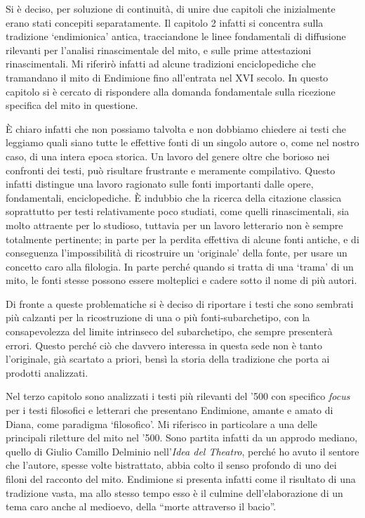 \documentclass[12pt,a4paper,openright, oneside]{book}
\begin{document}
Si è deciso, per soluzione di continuità, di unire due capitoli che inizialmente erano stati concepiti separatamente. Il capitolo 2 infatti si concentra sulla tradizione `endimionica' antica, tracciandone le linee fondamentali di diffusione rilevanti per l'analisi rinascimentale del mito, e sulle prime attestazioni rinascimentali. Mi riferirò infatti ad alcune tradizioni enciclopediche che tramandano il mito di Endimione fino all'entrata nel XVI secolo. In questo capitolo si è cercato di rispondere alla domanda fondamentale sulla ricezione specifica del mito in questione.

È chiaro infatti che non possiamo talvolta e non dobbiamo chiedere ai testi che leggiamo quali siano tutte le effettive fonti di un singolo autore o, come nel nostro caso, di una intera epoca storica. Un lavoro del genere oltre che borioso nei confronti dei testi, può risultare frustrante e meramente compilativo. Questo infatti distingue una lavoro ragionato sulle fonti importanti dalle opere, fondamentali, enciclopediche. È indubbio che la ricerca della citazione classica soprattutto per testi relativamente poco studiati, come quelli rinascimentali, sia molto attraente per lo studioso, tuttavia per un lavoro letterario non è sempre totalmente pertinente; in parte per la perdita effettiva di alcune fonti antiche, e di conseguenza l'impossibilità di ricostruire un `originale' della fonte, per usare un concetto caro alla filologia. In parte perché quando si tratta di una `trama' di un mito, le fonti stesse possono essere molteplici e cadere sotto il nome di più autori.

Di fronte a queste problematiche si è deciso di riportare i testi che sono sembrati più calzanti per la ricostruzione di una o più fonti-subarchetipo, con la consapevolezza del limite intrinseco del subarchetipo, che sempre presenterà errori. Questo perché ciò che davvero interessa in questa sede non è tanto l'originale, già scartato a priori, bensì la storia della tradizione che porta ai prodotti analizzati. 

Nel terzo capitolo sono analizzati i testi più rilevanti del '500 con specifico \textit{focus} per i testi filosofici e letterari che presentano Endimione, amante e amato di Diana, come paradigma `filosofico'. Mi riferisco in particolare a una delle principali riletture del mito nel '500. Sono partita infatti da un approdo mediano, quello di Giulio Camillo Delminio nell'\textit{Idea del Theatro}, perché ho avuto il sentore che l'autore, spesse volte bistrattato, abbia colto il senso profondo di uno dei filoni del racconto del mito. Endimione si presenta infatti come il risultato di una tradizione vasta, ma allo stesso tempo esso è il culmine dell'elaborazione di un tema caro anche al medioevo, della ``morte attraverso il bacio''.
\end{document}
